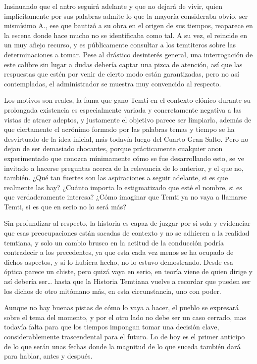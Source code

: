 \documentclass[
]{book}
\begin{document}
Insinuando que el antro seguirá adelante y que no dejará de vivir, quien implícitamente por sus palabras admite lo que la mayoría consideraba obvio, ser mismísimo A., ese que bautizó a su obra en el origen de sus tiempos, reaparece en la escena donde hace mucho no se identificaba como tal. A su vez, el reincide en un muy añejo recurso, y es públicamente consultar a los temtiteros sobre las determinaciones a tomar. Pese al drástico desinterés general, una interrogación de este calibre sin lugar a dudas debería captar una pizca de atención, así que las respuestas que estén por venir de cierto modo están garantizadas, pero no así contempladas, el administrador se muestra muy convencido al respecto.

Los motivos son reales, la fama que gano Temti en el contexto clónico durante su prolongada existencia es especialmente variada y concretamente negativa a las vistas de atraer adeptos, y justamente el objetivo parece ser limpiarla, además de que ciertamente el acrónimo formado por las palabras temas y tiempo se ha desvirtuado de la idea inicial, más todavía luego del Cuarto Gran Salto. Pero no dejan de ser demasiado chocantes, porque prácticamente cualquier anon experimentado que conozca mínimamente cómo se fue desarrollando esto, se ve invitado a hacerse preguntas acerca de la relevancia de lo anterior, y el que no, también. ¿Qué tan fuertes son las aspiraciones a seguir adelante, si es que realmente las hay? ¿Cuánto importa lo estigmatizado que esté el nombre, si es que verdaderamente interesa? ¿Cómo imaginar que Temti ya no vaya a llamarse Temti, si es que en serio no lo será más?

Sin profundizar al respecto, la historia es capaz de juzgar por si sola y evidenciar que esas preocupaciones están sacadas de contexto y no se adhieren a la realidad temtiana, y solo un cambio brusco en la actitud de la conducción podría contradecir a los precedentes, ya que esta cada vez menos se ha ocupado de dichos aspectos, y si lo hubiera hecho, no lo estuvo demostrando. Desde esa óptica parece un chiste, pero quizá vaya en serio, en teoría viene de quien dirige y así debería ser\ldots{} hasta que la Historia Temtiana vuelve a recordar que pueden ser los dichos de otro mitómano más, en esta circunstancia, uno con poder.

Aunque no hay buenas pistas de cómo lo vaya a hacer, el pueblo se expresará sobre el tema del momento, y por el otro lado no debe ser un caso cerrado, mas todavía falta para que los tiempos impongan tomar una decisión clave, considerablemente trascendental para el futuro. Lo de hoy es el primer anticipo de lo que serán unas fechas donde la magnitud de lo que suceda también dará para hablar, antes y después.
\end{document}
